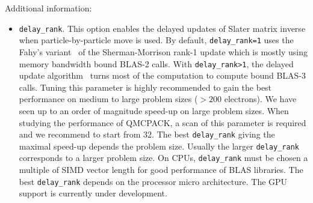 Additional information:
\begin{itemize}
\item \texttt{delay\_rank}. This option enables the delayed updates of Slater matrix inverse when particle-by-particle move is used.
By default, \texttt{delay\_rank=1} uses the Fahy's variant~\cite{Fahy1990} of the Sherman-Morrison rank-1 update which is mostly using memory bandwidth bound BLAS-2 calls.
With \texttt{delay\_rank>1}, the delayed update algorithm~\cite{Luo2018delayedupdate,McDaniel2017} turns most of the computation to compute bound BLAS-3 calls.
Tuning this parameter is highly recommended to gain the best performance on medium to large problem sizes ($>200$ electrons).
We have seen up to an order of magnitude speed-up on large problem sizes.
When studying the performance of QMCPACK, a scan of this parameter is required and we recommend to start from 32.
The best \texttt{delay\_rank} giving the maximal speed-up depends the problem size.
Usually the larger \texttt{delay\_rank} corresponds to a larger problem size.
On CPUs, \texttt{delay\_rank} must be chosen a multiple of SIMD vector length for good performance of BLAS libraries.
The best \texttt{delay\_rank} depends on the processor micro architecture.
The GPU support is currently under development.
\end{itemize}

